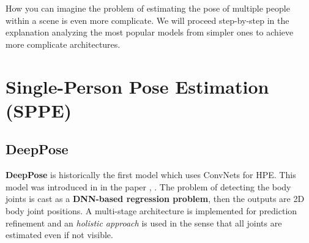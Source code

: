 How you can imagine the problem of estimating the pose of multiple people within a scene is even more complicate. We will proceed step-by-step in the explanation analyzing the most popular models from simpler ones to achieve more complicate architectures.

\section{Single-Person Pose Estimation (SPPE)}

\subsection{DeepPose}
\textbf{DeepPose} is historically the first model which uses ConvNets for HPE. This model was introduced in  in the paper , \cite{Toshev_2014}. The problem of detecting the body joints is cast as a \textbf{DNN-based regression problem}, then the outputs are 2D body joint positions. A multi-stage architecture is implemented for prediction refinement and an \textit{holistic approach} is used in the sense that all joints are estimated even if not visible.

